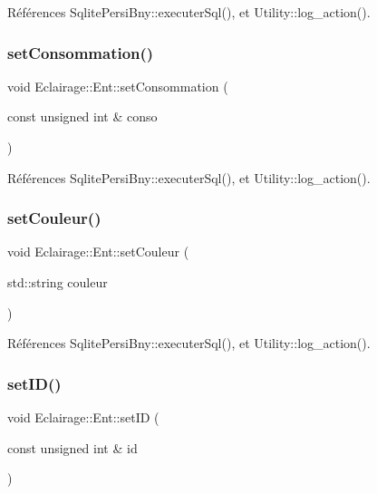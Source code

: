 Références Sqlite\+Persi\+Bny\+::executer\+Sql(), et Utility\+::log\+\_\+action().

\mbox{\label{classEclairage_1_1Ent_a64c03bcbe84186341b0d9f23e91cdfd8}} 
\subsubsection{\texorpdfstring{set\+Consommation()}{setConsommation()}}
{\footnotesize\ttfamily void Eclairage\+::\+Ent\+::set\+Consommation (\begin{DoxyParamCaption}\item[{const unsigned int \&}]{conso }\end{DoxyParamCaption})\hspace{0.3cm}{\ttfamily [virtual]}}



Références Sqlite\+Persi\+Bny\+::executer\+Sql(), et Utility\+::log\+\_\+action().

\mbox{\label{classEclairage_1_1Ent_a4cf307c89bd19221aa2cd338fa2eef7d}} 
\subsubsection{\texorpdfstring{set\+Couleur()}{setCouleur()}}
{\footnotesize\ttfamily void Eclairage\+::\+Ent\+::set\+Couleur (\begin{DoxyParamCaption}\item[{std\+::string}]{couleur }\end{DoxyParamCaption})\hspace{0.3cm}{\ttfamily [virtual]}}



Références Sqlite\+Persi\+Bny\+::executer\+Sql(), et Utility\+::log\+\_\+action().

\mbox{\label{classEclairage_1_1Ent_a927ff132e908bb3e68dab254f6c2ac2d}} 
\subsubsection{\texorpdfstring{set\+I\+D()}{setID()}}
{\footnotesize\ttfamily void Eclairage\+::\+Ent\+::set\+ID (\begin{DoxyParamCaption}\item[{const unsigned int \&}]{id }\end{DoxyParamCaption})\hspace{0.3cm}{\ttfamily [virtual]}}



